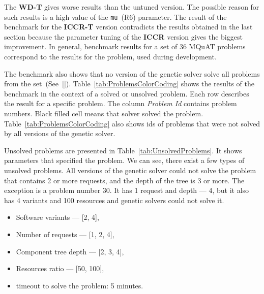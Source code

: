 The \textbf{WD-T} gives worse results than the untuned version. The possible reason for such results is a high value of the \texttt{mu}~(R6) parameter. The result of the benchmark for the \textbf{ICCR-T} version contradicts the results obtained in the last section because the parameter tuning of the \textbf{ICCR} version gives the biggest improvement. In general, benchmark results for a set of 36 MQuAT problems correspond to the results for the problem, used during development.

The benchmark also shows that no version of the genetic solver solve all problems from the set~(See~\ref{}). Table~\ref{tab:ProblemsColorCoding} shows the results of the benchmark in the context of a solved or unsolved problem. Each row describes the result for a specific problem. The column \textit{Problem Id} contains problem numbers. Black filled cell means that solver solved the problem. Table~\ref{tab:ProblemsColorCoding} also shows ids of problems that were not solved by all versions of the genetic solver.

Unsolved problems are presented in Table~\ref{tab:UnsolvedProblems}. It shows parameters that specified the problem. We can see, there exist a few types of unsolved problems. All versions of the genetic solver could not solve the problem that contains 2 or more requests, and the depth of the tree is 3 or more. The exception is a problem number 30. It has 1 request and depth — 4, but it also has 4 variants and 100 resources and genetic solvers could not solve it.

\begin{itemize}
	\item Software variants — [2, 4],
	\item Number of requests — [1, 2, 4],
	\item Component tree depth — [2, 3, 4],
	\item Resources ratio — [50, 100],
	\item timeout to solve the problem: 5 minutes.
\end{itemize}

